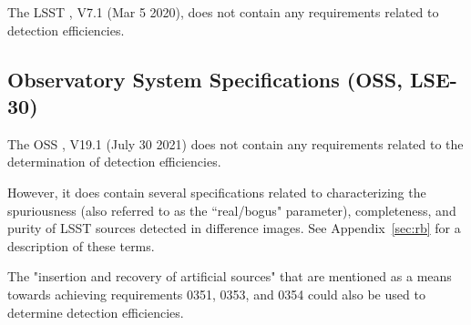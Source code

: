 The LSST , V7.1 (Mar 5 2020), does not contain any requirements related to detection efficiencies.


\subsection{Observatory System Specifications (OSS, LSE-30)}\label{ssec:docs_oss}

The OSS , V19.1 (July 30 2021) does not contain any requirements related to the determination of detection efficiencies.

However, it does contain several specifications related to characterizing the spuriousness (also referred to as the ``real/bogus" parameter), completeness, and purity of LSST sources detected in difference images.
See Appendix~\ref{sec:rb} for a description of these terms.

The "insertion and recovery of artificial sources" that are mentioned as a means towards achieving requirements 0351, 0353, and 0354 could also be used to determine detection efficiencies.

